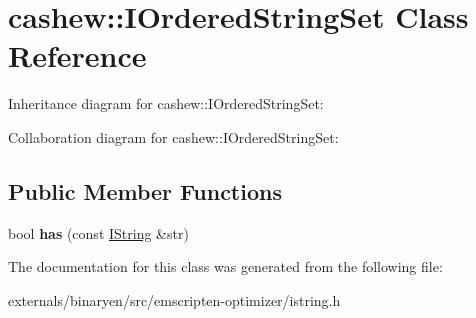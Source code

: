 \hypertarget{classcashew_1_1_i_ordered_string_set}{}\section{cashew\+:\+:I\+Ordered\+String\+Set Class Reference}
\label{classcashew_1_1_i_ordered_string_set}


Inheritance diagram for cashew\+:\+:I\+Ordered\+String\+Set\+:


Collaboration diagram for cashew\+:\+:I\+Ordered\+String\+Set\+:
\subsection*{Public Member Functions}
\begin{DoxyCompactItemize}
\item 
\mbox{\label{classcashew_1_1_i_ordered_string_set_a37096a11ef9c4e549cea09a17f7c5e20}} 
bool {\bfseries has} (const \mbox{\hyperlink{structcashew_1_1_i_string}{I\+String}} \&str)
\end{DoxyCompactItemize}


The documentation for this class was generated from the following file\+:\begin{DoxyCompactItemize}
\item 
externals/binaryen/src/emscripten-\/optimizer/istring.\+h\end{DoxyCompactItemize}

